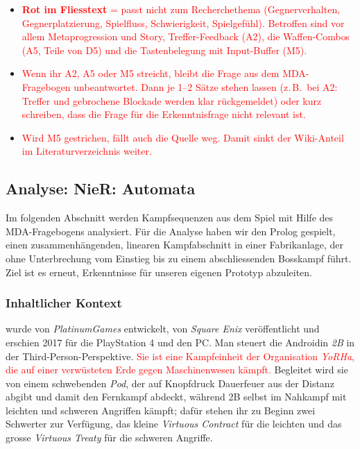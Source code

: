 \documentclass[../Main.tex]{subfiles}
\begin{document}
\begin{itemize}[leftmargin=1.5cm]
    \item \textcolor{red}{\textbf{Rot im Fliesstext} = passt nicht zum Recherchethema (Gegnerverhalten, Gegnerplatzierung, Spielfluss, Schwierigkeit, Spielgefühl). Betroffen sind vor allem Metaprogression und Story, Treffer-Feedback (A2), die Waffen-Combos (A5, Teile von D5) und die Tastenbelegung mit Input-Buffer (M5).}
    \item \textcolor{red}{Wenn ihr A2, A5 oder M5 streicht, bleibt die Frage aus dem MDA-Fragebogen unbeantwortet. Dann je 1--2 Sätze stehen lassen (z.\,B.\ bei A2: Treffer und gebrochene Blockade werden klar rückgemeldet) oder kurz schreiben, dass die Frage für die Erkenntnisfrage nicht relevant ist.}
    \item \textcolor{red}{Wird M5 gestrichen, fällt auch die Quelle  weg. Damit sinkt der Wiki-Anteil im Literaturverzeichnis weiter.}
\end{itemize}

\subsection{Analyse: NieR: Automata} \label{sec:ReferenzspielanalyseNier}

Im folgenden Abschnitt werden Kampfsequenzen aus dem Spiel  mit Hilfe des MDA-Fragebogens analysiert. Für die Analyse haben wir den Prolog gespielt, einen zusammenhängenden, linearen Kampfabschnitt in einer Fabrikanlage, der ohne Unterbrechung vom Einstieg bis zu einem abschliessenden Bosskampf führt. Ziel ist es erneut, Erkenntnisse für unseren eigenen Prototyp abzuleiten.

\subsubsection{Inhaltlicher Kontext}

 wurde von \textit{PlatinumGames} entwickelt, von \textit{Square Enix} veröffentlicht und erschien 2017 für die PlayStation 4 und den PC.\autocite{platinumgames_nierautomata_2017} Man steuert die Androidin \textit{2B} in der Third-Person-Perspektive. \textcolor{red}{Sie ist eine Kampfeinheit der Organisation \textit{YoRHa}, die auf einer verwüsteten Erde gegen Maschinenwesen kämpft.} Begleitet wird sie von einem schwebenden \textit{Pod}, der auf Knopfdruck Dauerfeuer aus der Distanz abgibt und damit den Fernkampf abdeckt, während 2B selbst im Nahkampf mit leichten und schweren Angriffen kämpft; dafür stehen ihr zu Beginn zwei Schwerter zur Verfügung, das kleine \textit{Virtuous Contract} für die leichten und das grosse \textit{Virtuous Treaty} für die schweren Angriffe.
\end{document}
